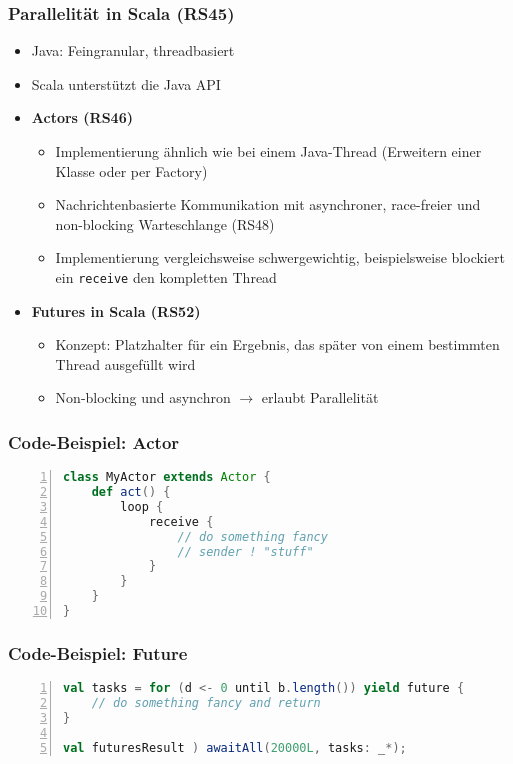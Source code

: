 \subsubsection{Parallelität in Scala (RS45)}
\begin{itemize}
	\item Java: Feingranular, threadbasiert
	\item Scala unterstützt die Java API
	\item \textbf{Actors (RS46)}
	\begin{itemize}
		\item Implementierung ähnlich wie bei einem Java-Thread (Erweitern einer Klasse oder per Factory)
		\item Nachrichtenbasierte Kommunikation mit asynchroner, race-freier und non-blocking Warteschlange (RS48)
		\item Implementierung vergleichsweise schwergewichtig, beispielsweise blockiert ein \texttt{receive} den kompletten Thread
	\end{itemize}
	\item \textbf{Futures in Scala (RS52)}
	\begin{itemize}
		\item Konzept: Platzhalter für ein Ergebnis, das später von einem bestimmten Thread ausgefüllt wird
		\item Non-blocking und asynchron \(\rightarrow\) erlaubt Parallelität
	\end{itemize}
\end{itemize}

\subsubsection{Code-Beispiel: Actor}
\begin{minipage}{\linewidth}
\begin{lstlisting}[frame=single,numbers=left,mathescape,language=Scala]
class MyActor extends Actor {
	def act() {
		loop {
			receive {
				// do something fancy
				// sender ! "stuff"
			}
		}
	}
}
\end{lstlisting}
\end{minipage}

\subsubsection{Code-Beispiel: Future}
\begin{minipage}{\linewidth}
\begin{lstlisting}[frame=single,numbers=left,mathescape,language=Scala]
val tasks = for (d <- 0 until b.length()) yield future {
	// do something fancy and return
}

val futuresResult ) awaitAll(20000L, tasks: _*);
\end{lstlisting}
\end{minipage}

